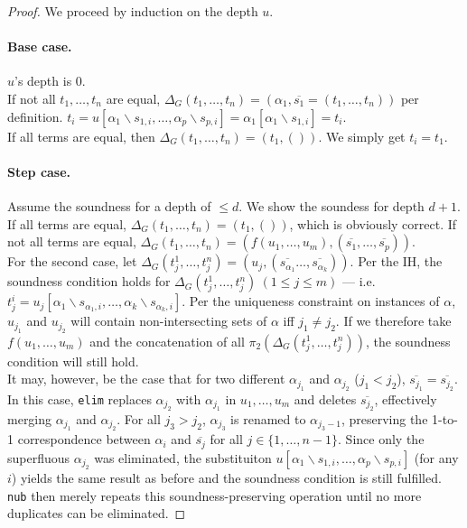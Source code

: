\documentclass[a4paper, 11pt]{report}
\begin{document}
\begin{proof} We proceed by induction on the depth $u$.
\paragraph{Base case.} $u$'s depth is 0.\\
If not all $t_1,\dots,t_n$ are equal, $\Delta_G(t_1,\dots,t_n) = (\alpha_1,\overline{s_1} = (t_1,\dots,t_n))$ per definition.
$t_i = u[\alpha_1\backslash s_{1,i},\dots,\alpha_p\backslash s_{p,i}] = \alpha_1[\alpha_1\backslash s_{1,i}] = t_i$.\\
If all terms are equal, then $\Delta_G(t_1,\dots,t_n) = (t_1,())$. We simply get $t_i = t_1$.


\paragraph{Step case.} Assume the soundness for a depth of $\leq d$. We show the soundess for depth $d+1$.\\

\noindent
If all terms are equal, $\Delta_G(t_1,\dots,t_n) = (t_1,())$, which is obviously correct.
If not all terms are equal, $\Delta_G(t_1,\dots,t_n) = (f(u_1,\dots,u_m), (\overline{s_1},\dots,\overline{s_p}))$.\\

\noindent
For the second case, let $\Delta_G(t_j^1,\dots,t_j^n) = (u_j,(\overline{s_{\alpha_1}}\dots,\overline{s_{\alpha_k}}))$. Per the IH, the soundness condition holds for $\Delta_G(t_j^1,\dots,t_j^n)\ (1\leq j\leq m)$ --- i.e. $t_j^i = u_j[\alpha_1\backslash s_{\alpha_1,i},\dots,\alpha_k\backslash s_{\alpha_k,i}]$. Per the uniqueness constraint on instances of $\alpha$, $u_{j_1}$ and $u_{j_2}$ will contain non-intersecting sets of $\alpha$ iff $j_1 \neq j_2$. If we therefore take $f(u_1,\dots,u_m)$ and the concatenation of all $\pi_2(\Delta_G(t_j^1,\dots,t_j^n))$, the soundness condition will still hold.\\

It may, however, be the case that for two different $\alpha_{j_1}$ and $\alpha_{j_2}$ ($j_1 < j_2$), $\overline{s_{j_1}} = \overline{s_{j_2}}$. In this case, \texttt{elim} replaces $\alpha_{j_2}$ with $\alpha_{j_1}$ in $u_1,\dots,u_m$ and deletes $\overline{s_{j_2}}$, effectively merging $\alpha_{j_1}$ and $\alpha_{j_2}$. For all $j_3 > j_2$, $\alpha_{j_3}$ is renamed to $\alpha_{j_3 - 1}$, preserving the 1-to-1 correspondence between $\alpha_i$ and $\overline{s_j}$ for all $j \in \{1,\dots,n-1\}$. Since only the superfluous $\alpha_{j_2}$ was eliminated, the substituiton $u[\alpha_1\backslash s_{1,i},\dots,\alpha_p\backslash s_{p,i}]$ (for any $i$) yields the same result as before and the soundness condition is still fulfilled.\\

\texttt{nub} then merely repeats this soundness-preserving operation until no more duplicates can be eliminated.

\end{proof}
\end{document}
